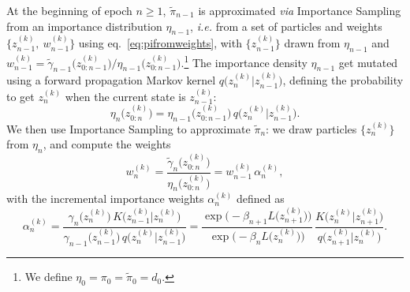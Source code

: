 \documentclass[11pt,a4paper]{article}
\begin{document}
	At the beginning of epoch $n\geq1$, $\tilde{\pi}_{n-1}$ is approximated \textit{via} Importance Sampling from an importance distribution $\eta_{n-1}$, \textit{i.e.} from a set of particles and weights $\big\{z_{n-1}^{(k)},\ w_{n-1}^{(k)}\big\}$ using eq.~\eqref{eq:pifromweights}, with $\big\{z_{n-1}^{(k)}\big\}$ drawn from $\eta_{n-1}$ and $w_{n-1}^{(k)} = \tilde{\gamma}_{n-1}\big(z_{0:n-1}^{(k)}\big)/\eta_{n-1}\big(z_{0:n-1}^{(k)}\big)$.\footnote{We define $\eta_{0} = \pi_{0} = \tilde{\pi}_{0} = d_{0}$.} The importance density $\eta_{n-1}$ get mutated using a forward propagation Markov kernel $q\big(z^{(k)}_{n}\vert z^{(k)}_{n-1}\big)$, defining the probability to get $z^{(k)}_{n}$ when the current state is $z^{(k)}_{n-1}$:
	\begin{equation}
		\eta_{n}\big(z_{0:n}^{(k)}\big) = \eta_{n-1}\big(z_{0:n-1}^{(k)}\big)\,q\big(z^{(k)}_{n}\vert z^{(k)}_{n-1}\big).
	\end{equation}
	We then use Importance Sampling to approximate $\tilde{\pi}_{n}$: we draw particles $\big\{z^{(k)}_{n}\big\}$ from $\eta_{n}$, and compute the weights
	\begin{equation} \label{eq:weightsupdate}
		w_{n}^{(k)} = \frac{\tilde{\gamma}_{n}\big(z_{0:n}^{(k)}\big)}{\eta_{n}\big(z_{0:n}^{(k)}\big)} = w_{n-1}^{(k)}\,\alpha_{n}^{(k)},
	\end{equation}
	with the incremental importance weights $\alpha_{n}^{(k)}$ defined as
	\begin{equation}	\label{eq: incremental_importance}
			\alpha^{(k)}_{n} =  \frac{\gamma_{n}\big(z_{n}^{(k)}\big)\,K\big(z^{(k)}_{n-1}\vert z^{(k)}_{n}\big)}{\gamma_{n-1}\big(z_{n-1}^{(k)}\big)\,q\big(z^{(k)}_{n}\vert z^{(k)}_{n-1}\big)} = \frac{\exp\Big(-\beta_{n+1}L\big(z_{n+1}^{(k)}\big)\Big)}{\exp\Big(-\beta_{n}L\big(z_{n}^{(k)}\big)\Big)}\,\frac{K\big(z^{(k)}_{n}\vert z^{(k)}_{n+1}\big)}{q\big(z^{(k)}_{n+1}\vert z^{(k)}_{n}\big)}.
	\end{equation}
\end{document}
